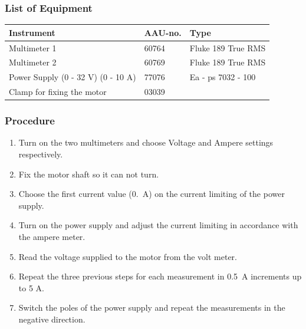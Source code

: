\subsubsection{List of Equipment}
\begin{table}[H]
\begin{tabular}{|l|l|p{4cm}|}
\hline%
  \textbf{Instrument}                        &  \textbf{AAU-no.}  &  \textbf{Type}       \\
\hline%
  Multimeter 1                               &  60764             &  Fluke 189 True RMS  \\
\hline%
  Multimeter 2                   		         &  60769             &  Fluke 189 True RMS  \\
\hline%
  Power Supply \small{(0 - 32 V) (0 - 10 A)} &  77076             &  Ea - ps 7032 - 100  \\
\hline%
  Clamp for fixing the motor                 &  03039             &                      \\
\hline%
\end{tabular}
\end{table}

\subsubsection{Procedure}

\begin{enumerate}
  \item Turn on the two multimeters and choose Voltage and Ampere settings respectively.
  \item Fix the motor shaft so it can not turn.
  \item Choose the first current value (\SI{0,}{A}) on the current limiting of the power supply.
  \item Turn on the power supply and adjust the current limiting in accordance with the ampere meter.
  \item Read the voltage supplied to the motor from the volt meter.
  \item Repeat the three previous steps for each measurement in \SI{0,5}{A} increments up to 5 A.
  \item Switch the poles of the power supply and repeat the measurements in the negative direction.
\end{enumerate}

